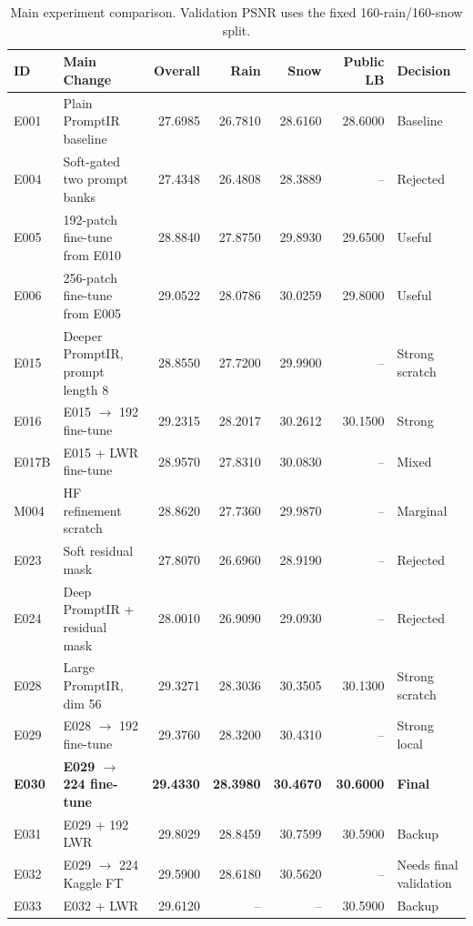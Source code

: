 \documentclass[10pt,conference]{article}
\begin{document}
\begin{table}[t]
\centering
\caption{Main experiment comparison. Validation PSNR uses the fixed 160-rain/160-snow split.}
\label{tab:main_results}
\begin{tabular}{llrrrrl}
\toprule
ID & Main Change & Overall & Rain & Snow & Public LB & Decision \\
\midrule
E001 & Plain PromptIR baseline & 27.6985 & 26.7810 & 28.6160 & 28.6000 & Baseline \\
E004 & Soft-gated two prompt banks & 27.4348 & 26.4808 & 28.3889 & -- & Rejected \\
E005 & 192-patch fine-tune from E010 & 28.8840 & 27.8750 & 29.8930 & 29.6500 & Useful \\
E006 & 256-patch fine-tune from E005 & 29.0522 & 28.0786 & 30.0259 & 29.8000 & Useful \\
E015 & Deeper PromptIR, prompt length 8 & 28.8550 & 27.7200 & 29.9900 & -- & Strong scratch \\
E016 & E015 $\rightarrow$ 192 fine-tune & 29.2315 & 28.2017 & 30.2612 & 30.1500 & Strong \\
E017B & E015 + LWR fine-tune & 28.9570 & 27.8310 & 30.0830 & -- & Mixed \\
M004 & HF refinement scratch & 28.8620 & 27.7360 & 29.9870 & -- & Marginal \\
E023 & Soft residual mask & 27.8070 & 26.6960 & 28.9190 & -- & Rejected \\
E024 & Deep PromptIR + residual mask & 28.0010 & 26.9090 & 29.0930 & -- & Rejected \\
E028 & Large PromptIR, dim 56 & 29.3271 & 28.3036 & 30.3505 & 30.1300 & Strong scratch \\
E029 & E028 $\rightarrow$ 192 fine-tune & 29.3760 & 28.3200 & 30.4310 & -- & Strong local \\
\textbf{E030} & \textbf{E029 $\rightarrow$ 224 fine-tune} & \textbf{29.4330} & \textbf{28.3980} & \textbf{30.4670} & \textbf{30.6000} & \textbf{Final} \\
E031 & E029 + 192 LWR & 29.8029 & 28.8459 & 30.7599 & 30.5900 & Backup \\
E032 & E029 $\rightarrow$ 224 Kaggle FT & 29.5900 & 28.6180 & 30.5620 & -- & Needs final validation \\
E033 & E032 + LWR & 29.6120 & -- & -- & 30.5900 & Backup \\
\bottomrule
\end{tabular}
\end{table}
\end{document}
